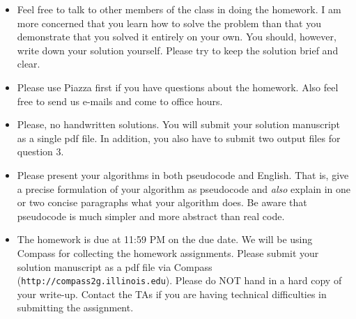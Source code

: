 
\usepackage{graphicx,amssymb,amsmath}
\sloppy
\newcommand{\ignore}[1]{}

\oddsidemargin 0in
\evensidemargin 0in
\textwidth 6.5in
\topmargin -0.5in
\textheight 9.0in




\begin{footnotesize}
\begin{itemize}
\item Feel free to talk to other members of the class in doing the homework.  I am
more concerned that you learn how to solve the problem than that you
demonstrate that you solved it entirely on your own.  You should, however,
write down your solution yourself.  Please try to keep the solution brief and
clear.

\item Please use Piazza first if you have questions about the homework.
  Also feel free to send us e-mails and come to office hours.

\item Please, no handwritten solutions. You will submit your solution 
  manuscript as a single pdf file. In addition, you also have to submit two 
  output files for question 3.

\item Please present your algorithms in both pseudocode and English.  That is, give
a precise formulation of your algorithm as pseudocode and {\em also} explain
in one or two concise paragraphs what your algorithm does.  Be aware that
pseudocode is much simpler and more abstract than real code.

\item The homework is due at 11:59 PM on the due date. We will be using
Compass for collecting the homework assignments. Please submit your solution manuscript as a pdf file via Compass 
(\texttt{http://compass2g.illinois.edu}). Please do NOT hand in a hard copy of your write-up.
Contact the TAs if you are having technical difficulties in 
submitting the assignment. 
\end{itemize}
\end{footnotesize}


